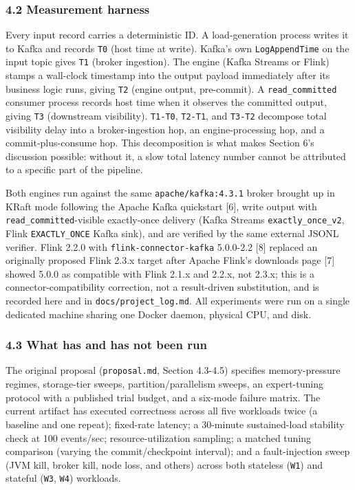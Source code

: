 \documentclass[
]{article}
\begin{document}
\hypertarget{measurement-harness}{%
\subsubsection{4.2 Measurement harness}\label{measurement-harness}}

Every input record carries a deterministic ID. A load-generation process
writes it to Kafka and records \texttt{T0} (host time at write). Kafka's
own \texttt{LogAppendTime} on the input topic gives \texttt{T1} (broker
ingestion). The engine (Kafka Streams or Flink) stamps a wall-clock
timestamp into the output payload immediately after its business logic
runs, giving \texttt{T2} (engine output, pre-commit). A
\texttt{read\_committed} consumer process records host time when it
observes the committed output, giving \texttt{T3} (downstream
visibility). \texttt{T1-T0}, \texttt{T2-T1}, and \texttt{T3-T2}
decompose total visibility delay into a broker-ingestion hop, an
engine-processing hop, and a commit-plus-consume hop. This decomposition
is what makes Section 6's discussion possible: without it, a slow total
latency number cannot be attributed to a specific part of the pipeline.

Both engines run against the same \texttt{apache/kafka:4.3.1} broker
brought up in KRaft mode following the Apache Kafka quickstart {[}6{]},
write output with \texttt{read\_committed}-visible exactly-once delivery
(Kafka Streams \texttt{exactly\_once\_v2}, Flink \texttt{EXACTLY\_ONCE}
Kafka sink), and are verified by the same external JSONL verifier. Flink
2.2.0 with \texttt{flink-connector-kafka} 5.0.0-2.2 {[}8{]} replaced an
originally proposed Flink 2.3.x target after Apache Flink's downloads
page {[}7{]} showed 5.0.0 as compatible with Flink 2.1.x and 2.2.x, not
2.3.x; this is a connector-compatibility correction, not a result-driven
substitution, and is recorded here and in \texttt{docs/project\_log.md}.
All experiments were run on a single dedicated machine sharing one
Docker daemon, physical CPU, and disk.

\hypertarget{what-has-and-has-not-been-run}{%
\subsubsection{4.3 What has and has not been
run}\label{what-has-and-has-not-been-run}}

The original proposal (\texttt{proposal.md}, Section 4.3-4.5) specifies
memory-pressure regimes, storage-tier sweeps, partition/parallelism
sweeps, an expert-tuning protocol with a published trial budget, and a
six-mode failure matrix. The current artifact has executed correctness
across all five workloads twice (a baseline and one repeat); fixed-rate
latency; a 30-minute sustained-load stability check at 100 events/sec;
resource-utilization sampling; a matched tuning comparison (varying the
commit/checkpoint interval); and a fault-injection sweep (JVM kill,
broker kill, node loss, and others) across both stateless (\texttt{W1})
and stateful (\texttt{W3}, \texttt{W4}) workloads.
\end{document}
